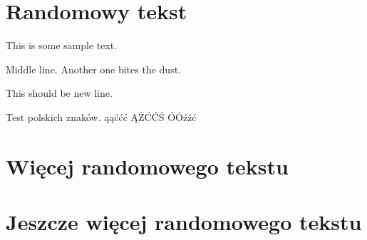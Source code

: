\documentclass{article}
\begin{document}
\newpage
\tableofcontents
\newpage

\section{Randomowy tekst}
This is some sample text.

Middle line.
Another one bites the dust.

This should be new line.

Test polskich znaków.
ąąććć ĄŻĆĆŚ ÓÓźźć

\blindtext[2]

\section{Więcej randomowego tekstu}
\blindtext[5]

\section{Jeszcze więcej randomowego tekstu}
\blindtext[7]
\end{document}
